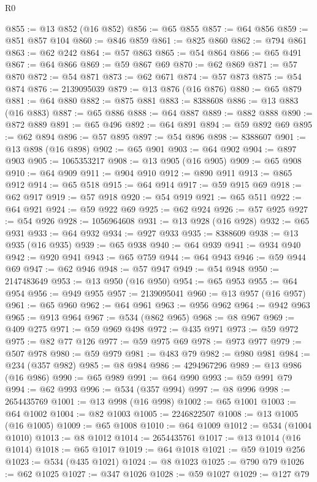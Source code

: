 \begin{lexlean}{R0}
\begin{coremodule}
@855 := @13 @852 (@16 @852)
@856 := @65 @855
@857 := @64 @856
@859 := @851 @857 @104
@860 := @846 @859
@861 := @825 @860
@862 := @794 @861
@863 := @62 @242
@864 := @57 @863
@865 := @54 @864
@866 := @65 @491
@867 := @64 @866
@869 := @59 @867 @69
@870 := @62 @869
@871 := @57 @870
@872 := @54 @871
@873 := @62 @671
@874 := @57 @873
@875 := @54 @874
@876 := 2139095039
@879 := @13 @876 (@16 @876)
@880 := @65 @879
@881 := @64 @880
@882 := @875 @881
@883 := 8388608
@886 := @13 @883 (@16 @883)
@887 := @65 @886
@888 := @64 @887
@889 := @882 @888
@890 := @872 @889
@891 := @65 @496
@892 := @64 @891
@894 := @59 @892 @69
@895 := @62 @894
@896 := @57 @895
@897 := @54 @896
@898 := 8388607
@901 := @13 @898 (@16 @898)
@902 := @65 @901
@903 := @64 @902
@904 := @897 @903
@905 := 1065353217
@908 := @13 @905 (@16 @905)
@909 := @65 @908
@910 := @64 @909
@911 := @904 @910
@912 := @890 @911
@913 := @865 @912
@914 := @65 @518
@915 := @64 @914
@917 := @59 @915 @69
@918 := @62 @917
@919 := @57 @918
@920 := @54 @919
@921 := @65 @511
@922 := @64 @921
@924 := @59 @922 @69
@925 := @62 @924
@926 := @57 @925
@927 := @54 @926
@928 := 1056964608
@931 := @13 @928 (@16 @928)
@932 := @65 @931
@933 := @64 @932
@934 := @927 @933
@935 := 8388609
@938 := @13 @935 (@16 @935)
@939 := @65 @938
@940 := @64 @939
@941 := @934 @940
@942 := @920 @941
@943 := @65 @759
@944 := @64 @943
@946 := @59 @944 @69
@947 := @62 @946
@948 := @57 @947
@949 := @54 @948
@950 := 2147483649
@953 := @13 @950 (@16 @950)
@954 := @65 @953
@955 := @64 @954
@956 := @949 @955
@957 := 2139095041
@960 := @13 @957 (@16 @957)
@961 := @65 @960
@962 := @64 @961
@963 := @956 @962
@964 := @942 @963
@965 := @913 @964
@967 := @534 (@862 @965)
@968 := @8 @967
@969 := @409 @275
@971 := @59 @969 @498
@972 := @435 @971
@973 := @59 @972
@975 := @82 @77 @126
@977 := @59 @975 @69
@978 := @973 @977
@979 := @507 @978
@980 := @59 @979
@981 := @483 @79
@982 := @980 @981
@984 := @234 (@357 @982)
@985 := @8 @984
@986 := 4294967296
@989 := @13 @986 (@16 @986)
@990 := @65 @989
@991 := @64 @990
@993 := @59 @991 @79
@994 := @62 @993
@996 := @534 (@357 @994)
@997 := @8 @996
@998 := 2654435769
@1001 := @13 @998 (@16 @998)
@1002 := @65 @1001
@1003 := @64 @1002
@1004 := @82 @1003
@1005 := 2246822507
@1008 := @13 @1005 (@16 @1005)
@1009 := @65 @1008
@1010 := @64 @1009
@1012 := @534 (@1004 @1010)
@1013 := @8 @1012
@1014 := 2654435761
@1017 := @13 @1014 (@16 @1014)
@1018 := @65 @1017
@1019 := @64 @1018
@1021 := @59 @1019 @256
@1023 := @534 (@435 @1021)
@1024 := @8 @1023
@1025 := @790 @79
@1026 := @62 @1025
@1027 := @347 @1026
@1028 := @59 @1027
@1029 := @127 @79

\end{coremodule}
\end{lexlean}
